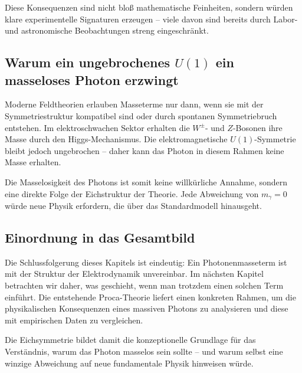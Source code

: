 Diese Konsequenzen sind nicht bloß mathematische Feinheiten, sondern würden 
klare experimentelle Signaturen erzeugen – viele davon sind bereits durch 
Labor- und astronomische Beobachtungen streng eingeschränkt.

\subsection*{Warum ein ungebrochenes $U(1)$ ein masseloses Photon erzwingt}

Moderne Feldtheorien erlauben Masseterme nur dann, wenn sie mit der 
Symmetriestruktur kompatibel sind oder durch spontanen Symmetriebruch 
entstehen. Im elektroschwachen Sektor erhalten die $W^\pm$- und $Z$-Bosonen 
ihre Masse durch den Higgs-Mechanismus. Die elektromagnetische 
$U(1)$-Symmetrie bleibt jedoch ungebrochen – daher kann das Photon in 
diesem Rahmen keine Masse erhalten.

Die Masselosigkeit des Photons ist somit keine willkürliche Annahme, 
sondern eine direkte Folge der Eichstruktur der Theorie. Jede Abweichung 
von $m_\gamma = 0$ würde neue Physik erfordern, die über das Standardmodell 
hinausgeht.

\subsection*{Einordnung in das Gesamtbild}

Die Schlussfolgerung dieses Kapitels ist eindeutig:  
Ein Photonenmasseterm ist mit der Struktur der Elektrodynamik unvereinbar.  
Im nächsten Kapitel betrachten wir daher, was geschieht, wenn man 
trotzdem einen solchen Term einführt. Die entstehende Proca-Theorie liefert 
einen konkreten Rahmen, um die physikalischen Konsequenzen eines massiven 
Photons zu analysieren und diese mit empirischen Daten zu vergleichen.

Die Eichsymmetrie bildet damit die konzeptionelle Grundlage für das 
Verständnis, warum das Photon masselos sein sollte – und warum selbst eine 
winzige Abweichung auf neue fundamentale Physik hinweisen würde.



